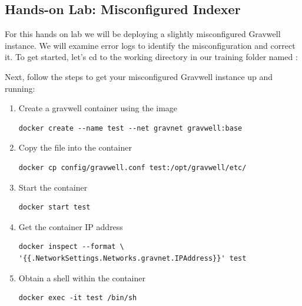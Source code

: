 \subsection{Hands-on Lab: Misconfigured Indexer}
\label{sec:MisconfiguredIndexer}

For this hands on lab we will be deploying a slightly misconfigured
Gravwell instance. We will examine error logs to identify the
misconfiguration and correct it. To get started, let's cd to the
working directory in our training folder named :


Next, follow the steps to get your misconfigured Gravwell instance up
and running:

\begin{enumerate}

\item Create a gravwell container using the  image
\begin{Verbatim}[breaklines=true]
docker create --name test --net gravnet gravwell:base
\end{Verbatim}

\item Copy the  file into the container
\begin{Verbatim}[breaklines=true]
docker cp config/gravwell.conf test:/opt/gravwell/etc/
\end{Verbatim}

\item Start the container

\begin{Verbatim}[breaklines=true]
docker start test
\end{Verbatim}

\item Get the container IP address
	\begin{Verbatim}[breaklines=true]
docker inspect --format \
'{{.NetworkSettings.Networks.gravnet.IPAddress}}' test
	\end{Verbatim}

\item Obtain a shell within the container
\begin{Verbatim}[breaklines=true]
docker exec -it test /bin/sh
\end{Verbatim}

\end{enumerate}


